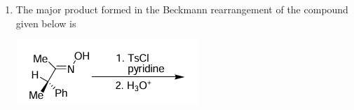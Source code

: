 \documentclass[journal,12pt,onecolumn]{IEEEtran}
\theoremstyle{remark}
\begin{document}
\begin{enumerate}
\begin{enumerate}
        \hfill{}
    \end{enumerate}



\item The major product formed in the Beckmann rearrangement of the compound given below is
    \begin{center}
     
        \includegraphics[width=0.6\columnwidth]{figs/q28.png}
    \end{center}
    \begin{enumerate}
        \begin{multicols}{2}
    

\end{multicols}
\end{enumerate}
\end{enumerate}
\end{document}
